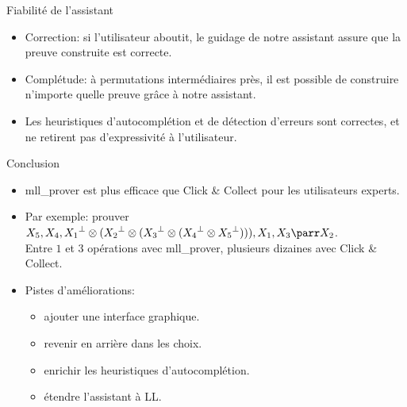 \documentclass{beamer}
\newcommand*{\orth}{^\perp}
\newcommand*{\tensor}{\otimes}
\begin{document}
\begin{frame}{Fiabilité de l'assistant}
    \begin{itemize}
        \item Correction: \pause si l'utilisateur aboutit, le guidage de notre assistant assure que la preuve construite est correcte.
            \pause
        \item Complétude: à permutations intermédiaires près, il est possible de construire n'importe quelle preuve grâce à notre assistant.
            \pause
        \item Les heuristiques d'autocomplétion et de détection d'erreurs sont correctes, et ne retirent pas d'expressivité à l'utilisateur.
    \end{itemize}
\end{frame}

\begin{frame}{Conclusion}
    \begin{itemize}
        \item mll\_prover est plus efficace que Click \& Collect pour les utilisateurs experts.
            \pause
        \item Par exemple: prouver $X_5, X_4, {X_1}\orth \tensor ({X_2}\orth \tensor ({X_3}\orth \tensor ({X_4}\orth \tensor {X_5}\orth))), X_1, X_3 \parr X_2$.\\
        Entre $1$ et $3$ opérations avec mll\_prover, plusieurs dizaines avec Click \& Collect.
            \pause
        \item Pistes d'améliorations:
            \begin{itemize}
                \item ajouter une interface graphique.
                \item revenir en arrière dans les choix.
                \item enrichir les heuristiques d'autocomplétion.
                \item étendre l'assistant à LL.
            \end{itemize}
    \end{itemize}
\end{frame}
\end{document}
